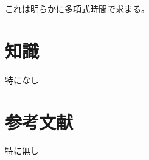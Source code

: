 \documentclass[a4paper, 10pt, dvipdfmx]{jlreq}
\begin{document}
これは明らかに多項式時間で求まる。

\section{知識}

特になし

\section{参考文献}

特に無し
\end{document}

